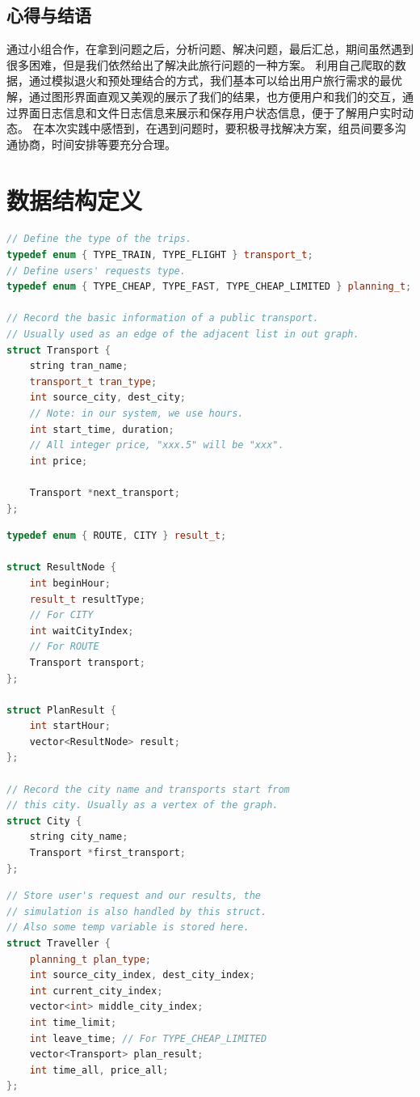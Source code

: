 \documentclass[lang=cn,blue,13pt]{elegantbook}
\begin{document}
\section{心得与结语}
通过小组合作，在拿到问题之后，分析问题、解决问题，最后汇总，期间虽然遇到很多困难，但是我们依然给出了解决此旅行问题的一种方案。
利用自己爬取的数据，通过模拟退火和预处理结合的方式，我们基本可以给出用户旅行需求的最优解，通过图形界面直观又美观的展示了我们的结果，也方便用户和我们的交互，通过界面日志信息和文件日志信息来展示和保存用户状态信息，便于了解用户实时动态。
在本次实践中感悟到，在遇到问题时，要积极寻找解决方案，组员间要多沟通协商，时间安排等要充分合理。
\appendix
\chapter{数据结构定义}

\begin{lstlisting}[language=C++,caption={Transport 的定义},captionpos=b]
// Define the type of the trips.
typedef enum { TYPE_TRAIN, TYPE_FLIGHT } transport_t;
// Define users' requests type.
typedef enum { TYPE_CHEAP, TYPE_FAST, TYPE_CHEAP_LIMITED } planning_t;

// Record the basic information of a public transport.
// Usually used as an edge of the adjacent list in out graph.
struct Transport {
	string tran_name;
	transport_t tran_type;
	int source_city, dest_city;
	// Note: in our system, we use hours.
	int start_time, duration;
	// All integer price, "xxx.5" will be "xxx".
	int price;

	Transport *next_transport;
};
\end{lstlisting}

\begin{lstlisting}[language=C++,caption={City 以及 PlanResult 的定义},captionpos=b]
typedef enum { ROUTE, CITY } result_t;

struct ResultNode {
	int beginHour;
	result_t resultType;
	// For CITY
	int waitCityIndex;
	// For ROUTE
	Transport transport;
};

struct PlanResult {
	int startHour;
	vector<ResultNode> result;
};

// Record the city name and transports start from
// this city. Usually as a vertex of the graph.
struct City {
	string city_name;
	Transport *first_transport;
};
\end{lstlisting}

\begin{lstlisting}[language=C++,caption={Traveller 的定义},captionpos=b]
// Store user's request and our results, the
// simulation is also handled by this struct.
// Also some temp variable is stored here.
struct Traveller {
	planning_t plan_type;
	int source_city_index, dest_city_index;
	int current_city_index;
	vector<int> middle_city_index;
	int time_limit;
	int leave_time; // For TYPE_CHEAP_LIMITED
	vector<Transport> plan_result;
	int time_all, price_all;
};
\end{lstlisting}
\end{document}
